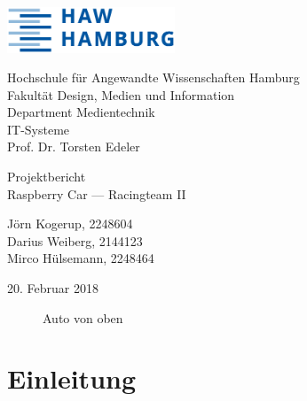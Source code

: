 \documentclass[a4paper, 12pt]{scrartcl}
\begin{document}
\thispagestyle{empty}

\begin{flushright}
	\includegraphics[width=5cm]{HAW_Logo.eps}
\end{flushright}

Hochschule für Angewandte Wissenschaften Hamburg\\
Fakultät Design, Medien und Information\\
Department Medientechnik\\[1ex]
IT-Systeme\\
Prof. Dr. Torsten Edeler

\vspace{1cm}

\begin{center}
	\large{Projektbericht}\\
	\LARGE{Raspberry Car --- Racingteam II}	
	\vspace{2ex}
	
	\large{
		Jörn Kogerup, 2248604\\
		Darius Weiberg, 2144123\\
		Mirco Hülsemann, 2248464
	}
	\vspace{2ex}
	
	\large{20. Februar 2018}
\end{center}

\vspace{1cm}

\begin{figure}[H] 
	\centering
	\caption{Auto von oben}
\end{figure}

\newpage

\tableofcontents

\newpage

\section{Einleitung}
\end{document}
